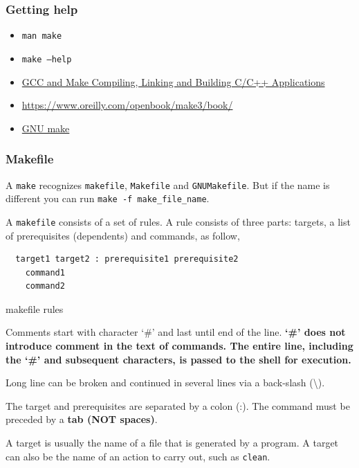 \subsubsection{Getting help}%
\label{ssub:getting_help}
\begin{itemize}
  \item \texttt{man make}
  \item \texttt{make --help}
  \item \href{https://www3.ntu.edu.sg/home/ehchua/programming/cpp/gcc_make.html} { GCC and Make Compiling, Linking and Building C/C++ Applications }
    \item \href{Managing Projects with GNU Make, Third Edition}{https://www.oreilly.com/openbook/make3/book/} 
    \item \href{https://www.gnu.org/software/make/manual/make.html\#toc-Overview-of-make} {GNU make}
\end{itemize}


\subsubsection{Makefile}%
A \texttt{make} recognizes \texttt{makefile}, \texttt{Makefile} and \texttt{GNUMakefile}. But if the name is different you can run \texttt{make -f make\_file\_name}.

A \texttt{makefile} consists of a set of rules. A rule consists of three parts: targets, a list of prerequisites (dependents) and commands, as follow,

\begin{listing}[!ht]
\begin{verbatim}
  target1 target2 : prerequisite1 prerequisite2
    command1
    command2
\end{verbatim}
\caption{makefile rules}
\label{makefile_rules}
\end{listing}

Comments start with character `\#' and last until end of the line.
\textbf{`\#' does not introduce comment in the text of commands. The entire line, including the `\#' and subsequent characters, is passed to the shell for execution.}


Long line can be broken and continued in several lines via a back-slash (\textbackslash).


The target and prerequisites are separated by a colon (:). The command must be preceded by a \textbf{tab (NOT spaces)}.

A target is usually the name of a file that is generated by a program.
A target can also be the name of an action to carry out, such as \texttt{clean}.

